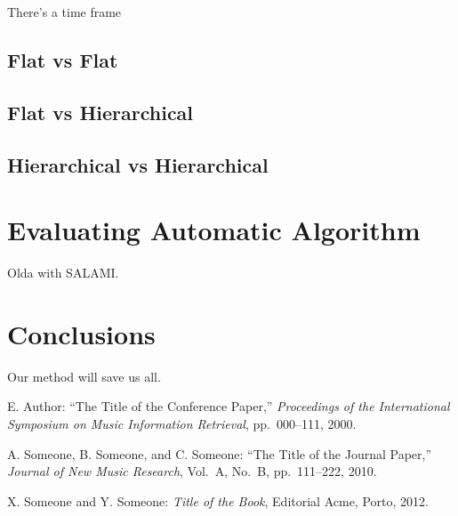 \documentclass{article}
\begin{document}
There's a time frame 


\subsection{Flat vs Flat}


\subsection{Flat vs Hierarchical}

\subsection{Hierarchical vs Hierarchical}

\section{Evaluating Automatic Algorithm}

Olda with SALAMI.




\section{Conclusions}

Our method will save us all.

\begin{thebibliography}{citations}

E. Author:
``The Title of the Conference Paper,''
{\it Proceedings of the International Symposium
on Music Information Retrieval}, pp.~000--111, 2000.

A. Someone, B. Someone, and C. Someone:
``The Title of the Journal Paper,''
{\it Journal of New Music Research},
Vol.~A, No.~B, pp.~111--222, 2010.

 X. Someone and Y. Someone: {\it Title of the Book},
    Editorial Acme, Porto, 2012.

\end{thebibliography}

%
\end{document}
